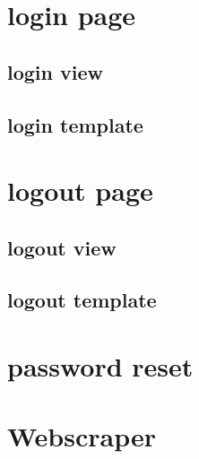 \section{login page}
\subsection{login view}
\subsection{login template}

\section{logout page}
\subsection{logout view}
\subsection{logout template}

\section{password reset}

\section{Webscraper}

